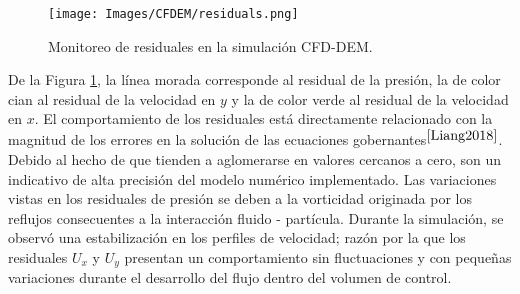\begin{figure}[h!]
	\centering
	\texttt{[image: Images/CFDEM/residuals.png]}
	\caption{Monitoreo de residuales en la simulaci\'on CFD-DEM.}
	\label{CFDEM:residuals}
\end{figure}

\noindent
\justify

De la Figura \ref{CFDEM:residuals}, la l\'inea morada corresponde al residual de la presi\'on, la de color cian al residual de la velocidad en $y$ y la de color verde al residual de la velocidad en $x$. El comportamiento de los residuales est\'a directamente relacionado con la magnitud de los errores en la soluci\'on de las ecuaciones gobernantes$^{\cite{Liang2018}}$. Debido al hecho de que tienden a aglomerarse en valores cercanos a cero, son un indicativo de alta precisi\'on del modelo num\'erico implementado. Las variaciones vistas en los residuales de presi\'on se deben a la vorticidad originada por los reflujos consecuentes a la interacci\'on fluido - part\'icula. Durante la simulaci\'on, se observ\'o una estabilizaci\'on en los perfiles de velocidad; raz\'on por la que los residuales $U_x$ y $U_y$ presentan un comportamiento sin fluctuaciones y con peque\~nas variaciones durante el desarrollo del flujo dentro del volumen de control.